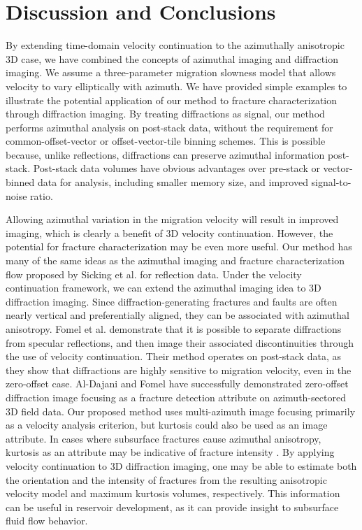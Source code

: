 \section{Discussion and Conclusions}
By extending time-domain velocity continuation to the azimuth\-ally anisotropic 3D case, we have combined the concepts of azimuthal imaging and diffraction imaging.  We assume a three-parameter migration slowness model that allows velocity to vary elliptically with azimuth.  We have provided simple examples to illustrate the potential application of our meth\-od to fracture characterization through diffraction imaging.  By treating diffractions as signal, our method performs azimuthal analysis on post-stack data, without the requirement for common-offset-vector or offset-vector-tile binning schemes.  This is possible because, unlike reflections, diffractions can preserve azimuthal information post-stack.  Post-stack data volumes have obvious advantages over pre-stack or vector-binned data for analysis, including smaller memory size, and improved signal-to-noise ratio.

Allowing azimuthal variation in the migration velocity will result in improved imaging, which is clearly a benefit of 3D velocity continuation.  However, the potential for fracture characterization may be even more useful.  Our method has many of the same ideas as the azimuthal imaging and fracture characterization flow proposed by Sicking et al. \cite{sicking_nelan_mclain07} for reflection data.  
Under the velocity continuation framework, we can extend the azimuthal imaging idea to 3D diffraction imaging.  
Since diffraction-generating fractures and faults are often nearly vertical and preferentially aligned, they can be associated with azimuthal anisotropy. 
Fomel et al. \cite{fomel_landa_taner07} demonstrate that it is possible to separate diffractions from specular reflections, and then image their associated discontinuities through the use of velocity continuation.  
Their method operates on post-stack data, as they show that diffractions are highly sensitive to migration velocity, even in the zero-offset case.
Al-Dajani and Fomel \cite{aldajani_fomel10} have successfully demonstrated zero-offset diffraction image focusing as a fracture detection attribute on azimuth-sectored 3D field data.
Our proposed method uses multi-azimuth image focusing primarily as a velocity analysis criterion, but kurtosis could also be used as an image attribute. 
In cases where subsurface fractures cause azimuthal anisotropy, kurtosis as an attribute may be indicative of fracture intensity \cite{aldajani_fomel10}.
By applying velocity continuation to 3D diffraction imaging, one may be able to estimate both the orientation and the intensity of fractures from the resulting anisotropic velocity model and maximum kurtosis volumes, respectively.  
This information can be useful in reservoir development, as it can provide insight to subsurface fluid flow behavior.  

